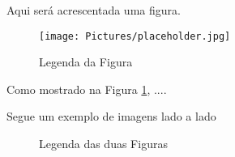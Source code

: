         Aqui será acrescentada uma figura.

        \begin{figure}[htbp!]
            \centering
            \texttt{[image: Pictures/placeholder.jpg]}
            \caption{Legenda da Figura}
            \label{fig:ref}
        \end{figure}


Como mostrado na Figura \ref{fig:ref}, ....





            
            Segue um exemplo de imagens lado a lado


            \begin{figure}[H]
                \centering
                \hfill
                \caption{Legenda das duas Figuras}
                \label{fig:ref3}
            \end{figure}
            

